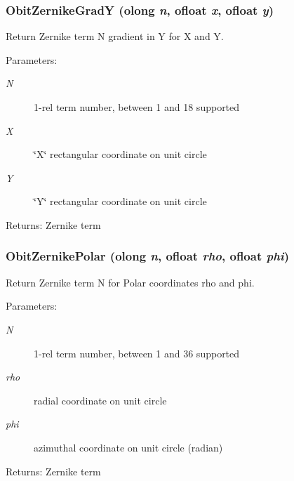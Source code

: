 \subsubsection{ Obit\-Zernike\-Grad\-Y ({\bf olong} {\em n}, {\bf ofloat} {\em x}, {\bf ofloat} {\em y})}\label{ObitZernike_8c_a2}


Return Zernike term N gradient in Y for X and Y. 

\begin{Desc}
\item[Parameters:]
\begin{description}
\item[{\em N}]1-rel term number, between 1 and 18 supported \item[{\em X}]\char`\"{}X\char`\"{} rectangular coordinate on unit circle \item[{\em Y}]\char`\"{}Y\char`\"{} rectangular coordinate on unit circle \end{description}
\end{Desc}
\begin{Desc}
\item[Returns:]Zernike term \end{Desc}
\subsubsection{ Obit\-Zernike\-Polar ({\bf olong} {\em n}, {\bf ofloat} {\em rho}, {\bf ofloat} {\em phi})}\label{ObitZernike_8c_a3}


Return Zernike term N for Polar coordinates rho and phi. 

\begin{Desc}
\item[Parameters:]
\begin{description}
\item[{\em N}]1-rel term number, between 1 and 36 supported \item[{\em rho}]radial coordinate on unit circle \item[{\em phi}]azimuthal coordinate on unit circle (radian) \end{description}
\end{Desc}
\begin{Desc}
\item[Returns:]Zernike term \end{Desc}
